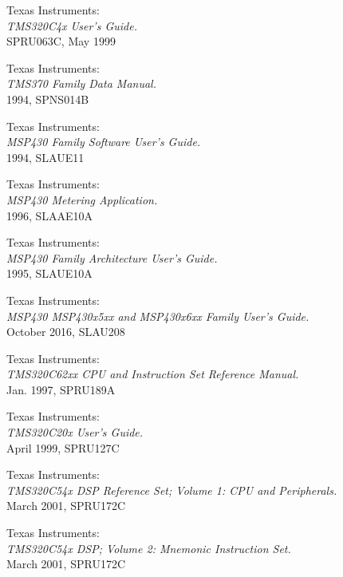  Texas Instruments: \\
                   {\em TMS320C4x User's Guide.\/} \\
                   SPRU063C, May 1999

 Texas Instruments: \\
                {\em TMS370 Family Data Manual.\/} \\
                1994, SPNS014B

 Texas Instruments: \\
                       {\em MSP430 Family Software User's Guide.\/} \\
                       1994, SLAUE11

 Texas Instruments: \\
                   {\em MSP430 Metering Application.\/} \\
                   1996, SLAAE10A

 Texas Instruments: \\
                       {\em MSP430 Family Architecture User's Guide.\/} \\
                       1995, SLAUE10A

 Texas Instruments: \\
                 {\em MSP430 MSP430x5xx and MSP430x6xx Family
                  User's Guide.\/} \\
                 October 2016, SLAU208

 Texas Instruments: \\
                {\em TMS320C62xx CPU and Instruction Set Reference
                 Manual.\/} \\
                Jan. 1997, SPRU189A

 Texas Instruments: \\
                 {\em TMS320C20x User's Guide.\/} \\
                 April 1999, SPRU127C

 Texas Instruments: \\
                     {\em TMS320C54x DSP Reference Set;
                     Volume 1: CPU and Peripherals.\/} \\
                     March 2001, SPRU172C

 Texas Instruments: \\
                     {\em TMS320C54x DSP; Volume 2: Mnemonic Instruction
                     Set.\/} \\
                     March 2001, SPRU172C

